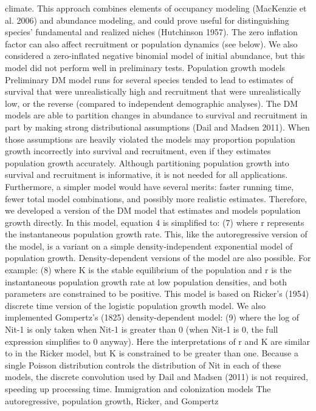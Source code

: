 \documentclass{article}
\begin{document}
climate.  This approach combines elements of occupancy modeling
(MacKenzie et al. 2006) and abundance modeling, and could prove useful
for distinguishing species' fundamental and realized niches
(Hutchinson 1957).   The zero inflation factor can also affect
recruitment or population dynamics (see below).
We also considered a zero-inflated negative binomial model of initial
abundance, but this model did not perform well in preliminary tests.
Population growth models
Preliminary DM model runs for several species tended to lead to
estimates of survival that were unrealistically high and recruitment
that were unrealistically low, or the reverse (compared to independent
demographic analyses).  The DM models are able to partition changes in
abundance to survival and recruitment in part by making strong
distributional assumptions (Dail and Madsen 2011).  When those
assumptions are heavily violated the models may proportion population
growth incorrectly into survival and recruitment, even if they
estimates population growth accurately.
Although partitioning population growth into survival and recruitment
is informative, it is not needed for all applications.  Furthermore, a
simpler model would have several merits: faster running time, fewer
total model combinations, and possibly more realistic estimates.
Therefore, we developed a version of the DM model that estimates and
models population growth directly.  In this model, equation 4 is
simplified to:
(7)
where r represents the instantaneous population growth rate.  This,
like the autoregressive version of the model, is a variant on a simple
density-independent exponential model of population growth.
Density-dependent versions of the model are also possible.  For
example:
(8)
where K is the stable equilibrium of the population and r is the
instantaneous population growth rate at low population densities, and
both parameters are constrained to be positive.  This model is based
on Ricker's (1954) discrete time version of the logistic population
growth model.  We also implemented Gompertz's (1825) density-dependent
model:
(9)
where the log of Nit-1 is only taken when Nit-1 is greater than 0
(when Nit-1 is 0, the full expression simplifies to 0 anyway).  Here
the interpretations of r and K are similar to in the Ricker model, but
K is constrained to be greater than one.
Because a single Poisson distribution controls the
distribution of Nit in each of these models, the discrete
convolution used by Dail and Madsen (2011) is not required,
speeding up processing time.
Immigration and colonization models
The autoregressive, population growth, Ricker, and Gompertz
\end{document}
